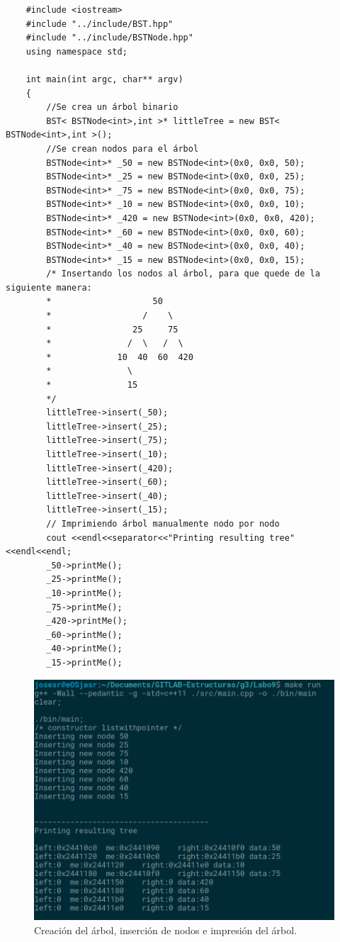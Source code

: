     
    \begin{verbatim}
    #include <iostream>
    #include "../include/BST.hpp"
    #include "../include/BSTNode.hpp"
    using namespace std;
    
    int main(int argc, char** argv)
    {
        //Se crea un árbol binario
        BST< BSTNode<int>,int >* littleTree = new BST< BSTNode<int>,int >();
        //Se crean nodos para el árbol
        BSTNode<int>* _50 = new BSTNode<int>(0x0, 0x0, 50);
        BSTNode<int>* _25 = new BSTNode<int>(0x0, 0x0, 25);
        BSTNode<int>* _75 = new BSTNode<int>(0x0, 0x0, 75);
        BSTNode<int>* _10 = new BSTNode<int>(0x0, 0x0, 10);
        BSTNode<int>* _420 = new BSTNode<int>(0x0, 0x0, 420);
        BSTNode<int>* _60 = new BSTNode<int>(0x0, 0x0, 60);
        BSTNode<int>* _40 = new BSTNode<int>(0x0, 0x0, 40);
        BSTNode<int>* _15 = new BSTNode<int>(0x0, 0x0, 15);
        /* Insertando los nodos al árbol, para que quede de la siguiente manera:
        *                    50
        *                  /    \
        *                25     75
        *               /  \   /  \
        *             10  40  60  420
        *               \
        *               15
        */
        littleTree->insert(_50);
        littleTree->insert(_25);
        littleTree->insert(_75);
        littleTree->insert(_10);
        littleTree->insert(_420);
        littleTree->insert(_60);
        littleTree->insert(_40);
        littleTree->insert(_15);
        // Imprimiendo árbol manualmente nodo por nodo
        cout <<endl<<separator<<"Printing resulting tree" <<endl<<endl;
        _50->printMe();
        _25->printMe();
        _10->printMe();
        _75->printMe();
        _420->printMe();
        _60->printMe();
        _40->printMe();
        _15->printMe();
    \end{verbatim}



\begin{figure}[H]
\centering
\includegraphics[width=\textwidth]{imgs/Labo9/L9-1.png}
\caption{Creación del árbol, inserción de nodos e impresión del árbol.}
\label{fig:1}
\end{figure}

